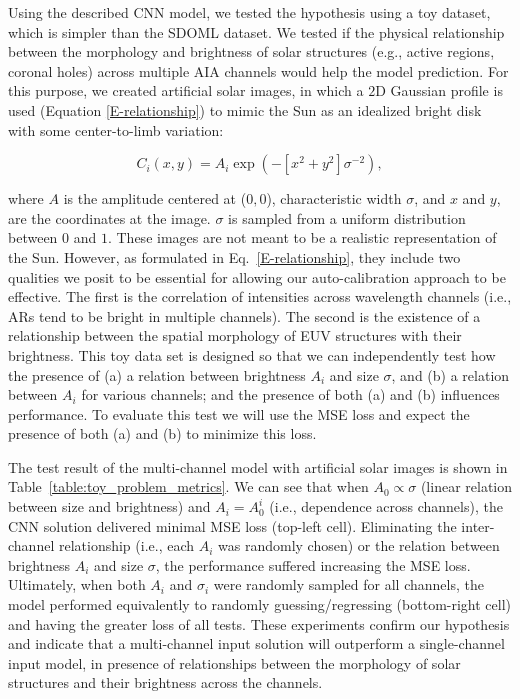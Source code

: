 \documentclass{aa}
\begin{document}
Using the described CNN model, we tested the hypothesis using a toy dataset, which is simpler than the SDOML dataset. We tested if the physical relationship between the morphology and brightness of solar structures (e.g., active regions, coronal holes) across multiple AIA channels would help the model prediction. For this purpose, we created artificial solar images, in which a $2$D Gaussian profile is used (Equation \ref{E-relationship}) to mimic the Sun as an idealized bright disk with some center-to-limb variation:

\begin{equation}
\label{E-relationship}
    C_i(x,y) = A_i \exp{(-[x^2+y^2]{\sigma^{-2}})},
\end{equation}

where $A$ is the amplitude centered at ($0,0$), characteristic width $\sigma$, and $x$ and $y$, are the coordinates at the image. $\sigma$ is sampled from a uniform distribution between $0$ and $1$. These images are not meant to be a realistic representation of the Sun. However, as formulated in Eq.~\ref{E-relationship}, they include two qualities we posit to be essential for allowing our auto-calibration approach to be effective. The first is the correlation of intensities across wavelength channels (i.e., ARs tend to be bright in multiple channels). The second is the existence of a relationship between the spatial morphology of EUV structures with their brightness. This toy data set is designed so that we can independently test how the presence of (a) a relation between brightness $A_i$ and size $\sigma$, and  (b) a relation between $A_i$ for various channels; and the presence of both (a) and (b) influences performance. To evaluate this test we will use the MSE loss and expect the presence of both (a) and (b) to minimize this loss.

The test result of the multi-channel model with artificial solar images is shown in Table~\ref{table:toy_problem_metrics}. We can see that when $A_0 \propto \sigma$ (linear relation between size and brightness) and $A_i = A_0^i$ (i.e., dependence across channels), the CNN solution delivered minimal MSE loss (top-left cell). Eliminating the inter-channel relationship (i.e., each $A_i$ was randomly chosen) or the relation between brightness $A_i$ and size $\sigma$, the performance suffered increasing the MSE loss. Ultimately, when both $A_i$ and $\sigma_i$ were randomly sampled for all channels, the model performed equivalently to randomly guessing/regressing (bottom-right cell) and having the greater loss of all tests. These experiments confirm our hypothesis and indicate that a multi-channel input solution will outperform a single-channel input model, in presence of relationships between the morphology of solar structures and their brightness across the channels. 
\end{document}
